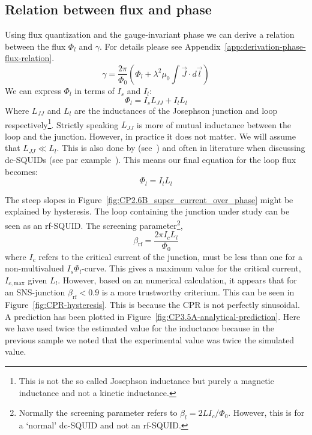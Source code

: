 \subsection{Relation between flux and phase}
\label{sec:flux-phase-relation}
Using flux quantization and the gauge-invariant phase we can derive a relation between the flux $\Phi_l$ and $\gamma$. For details please see Appendix~\ref{app:derivation-phase-flux-relation}.
\begin{equation}
	\gamma = \frac{2\pi}{\Phi_0}\left(\Phi_l + \lambda^2\mu_0 \int \vec{J}\cdot d \vec{l} \right)
	\label{eqn:phase-flux-relation}
\end{equation}
We can express $\Phi_l$ in terms of $I_s$ and $I_l$:
\begin{equation}
	\Phi_l = I_sL_{JJ}  + I_lL_l
\end{equation}
Where $L_{JJ}$ and $L_l$ are the inductances of the Josephson junction and loop respectively\footnote{This is not the so called Josephson inductance but purely a magnetic inductance and not a kinetic inductance.}. Strictly speaking $L_{JJ}$ is more of mutual inductance between the loop and the junction. However, in practice it does not matter. We will assume that $L_{JJ} \ll L_l$. This is also done by \citeauthor{frolovMeasurementCurrentPhaseRelation2004} (see~\cite{frolovCurrentphaseRelationsJosephson2005,frolovMeasurementCurrentPhaseRelation2004}) and often in literature when discussing dc-SQUIDs (see par example~\cite{clarkeSQUIDHandbook2004}). This means our final equation for the loop flux becomes:
\begin{equation}
	\Phi_l = I_lL_l
\end{equation}

The steep slopes in Figure~\ref{fig:CP2.6B_super_current_over_phase} might be explained by hysteresis. The loop containing the junction under study can be seen as an rf-SQUID.\cite{clarkeSQUIDHandbook2004} The screening parameter\footnote{Normally the screening parameter refers to $\beta_l = 2LI_c/\Phi_0$. However, this is for a `normal' dc-SQUID and not an rf-SQUID.},
\begin{equation}
	\beta_{\text{rf}} = \frac{2\pi I_c L_l}{\Phi_0}
\end{equation}
where $I_c$ refers to the critical current of the junction, must be less than one for a non-multivalued $I_s\Phi_l$-curve\cite{clarkeSQUIDHandbook2004,frolovMeasurementCurrentPhaseRelation2004}. This gives a maximum value for the critical current, $I_{c,\text{max}}$ given $L_l$. However, based on an numerical calculation, it appears that for an SNS-junction $\beta_{\text{rf}} < 0.9$ is a more trustworthy criterium. This can be seen in Figure~\ref{fig:CPR-hysteresis}. This is because the CPR is not perfectly sinusoidal\cite{vermeerSTMbasedScanningSQUID2021,likharevSuperconductingWeakLinks1979}. A prediction has been plotted in Figure~\ref{fig:CP3.5A-analytical-prediction}. Here we have used twice the estimated value for the inductance because in the previous sample we noted that the experimental value was twice the simulated value.

